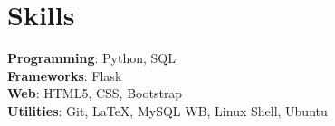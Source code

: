 \section*{\sc Skills}
\vspace{-2mm}
\hrulefill
\vspace{1mm}

\textbf{Programming}: Python, SQL\\
\textbf{Frameworks}: Flask\\
\textbf{Web}: HTML5, CSS, Bootstrap\\
\textbf{Utilities}: Git, \LaTeX, MySQL WB, Linux Shell, Ubuntu\\
